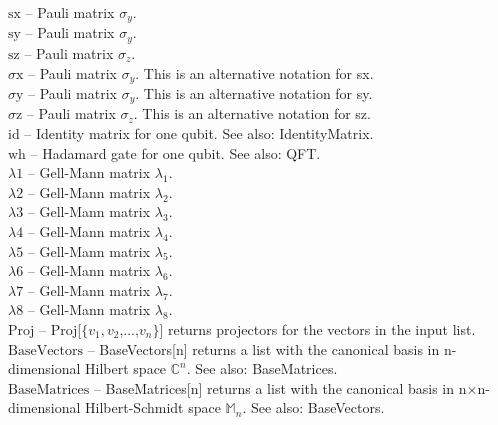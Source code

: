 \noindent\textbf{$ \text{sx} $ }-- Pauli matrix $ \sigma _y. $\\
\noindent\textbf{$ \text{sy} $ }-- Pauli matrix $ \sigma _y. $\\
\noindent\textbf{$ \text{sz} $ }-- Pauli matrix $ \sigma _z. $\\
\noindent\textbf{$ \text{$\sigma $x} $ }-- Pauli matrix $ \sigma _y $. This is an alternative notation for sx.$  $\\
\noindent\textbf{$ \text{$\sigma $y} $ }-- Pauli matrix $ \sigma _y $. This is an alternative notation for sy.$  $\\
\noindent\textbf{$ \text{$\sigma $z} $ }-- Pauli matrix $ \sigma _z $. This is an alternative notation for sz.$  $\\
\noindent\textbf{$ \text{id} $ }-- Identity matrix for one qubit. See also: IdentityMatrix.$  $\\
\noindent\textbf{$ \text{wh} $ }-- Hadamard gate for one qubit. See also: QFT.$  $\\
\noindent\textbf{$ \text{$\lambda $1} $ }-- Gell-Mann matrix $ \lambda _1. $\\
\noindent\textbf{$ \text{$\lambda $2} $ }-- Gell-Mann matrix $ \lambda _2. $\\
\noindent\textbf{$ \text{$\lambda $3} $ }-- Gell-Mann matrix $ \lambda _3. $\\
\noindent\textbf{$ \text{$\lambda $4} $ }-- Gell-Mann matrix $ \lambda _4. $\\
\noindent\textbf{$ \text{$\lambda $5} $ }-- Gell-Mann matrix $ \lambda _5. $\\
\noindent\textbf{$ \text{$\lambda $6} $ }-- Gell-Mann matrix $ \lambda _6. $\\
\noindent\textbf{$ \text{$\lambda $7} $ }-- Gell-Mann matrix $ \lambda _7. $\\
\noindent\textbf{$ \text{$\lambda $8} $ }-- Gell-Mann matrix $ \lambda _8. $\\
\noindent\textbf{$ \text{Proj} $ }-- Proj[$\{$$ v_1,v_2 $,...,$ v_n $$\}$] returns projectors for the vectors in the input list.$  $\\
\noindent\textbf{$ \text{BaseVectors} $ }-- BaseVectors[n] returns a list with the canonical basis in n-dimensional Hilbert space $ \mathbb{C}^n $. See also: BaseMatrices.$  $\\
\noindent\textbf{$ \text{BaseMatrices} $ }-- BaseMatrices[n] returns a list with the canonical basis in n$\times $n-dimensional Hilbert-Schmidt space $ \mathbb{M}_n $. See also: BaseVectors.$  $\\

